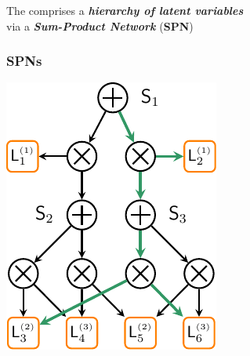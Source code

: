\documentclass[xcolor={usenames,dvipsnames,svgnames}, compress, aspectratio=169, 11pt]{beamer}
\begin{document}
\begin{frame}[t, htt=bgrey2]
\begin{minipage}[t]{0.3\linewidth}
  \end{minipage}\begin{minipage}[t]{0.35\linewidth}
    \vspace{20pt}
    \raggedright
    The  comprises a
    \emph{\textbf{ hierarchy of latent variables}}\\[20pt]
    via a \emph{\textbf{Sum-Product Network}} (\textbf{SPN})\\
  \end{minipage}

  
\end{frame}

\begin{frame}[t, htt=bgrey2]
  \frametitle{SPNs}

  \large
  \begin{minipage}[t]{0.25\linewidth}
    \vspace{15pt}
    \includegraphics[width=.9\linewidth]{figures/hspn}
  \end{minipage}%

\end{frame}
\end{document}
